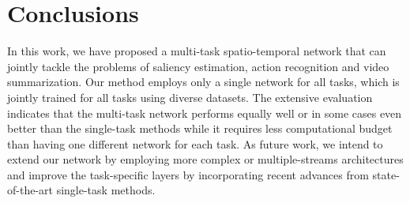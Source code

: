 \documentclass[10pt,twocolumn,letterpaper]{article}
\begin{document}
\section{Conclusions}

In this work, we have proposed a multi-task spatio-temporal network that can jointly tackle the problems of saliency estimation, action recognition and video summarization. Our method employs only a single network for all tasks, which is jointly trained for all tasks using diverse datasets. The extensive evaluation indicates that the multi-task network performs equally well or in some cases even better than the single-task methods while it requires less computational budget than having one different network for each task. As future work, we intend to extend our network by employing more complex or multiple-streams architectures and improve the task-specific layers by incorporating recent advances from state-of-the-art single-task methods.



{\small


}
\end{document}
